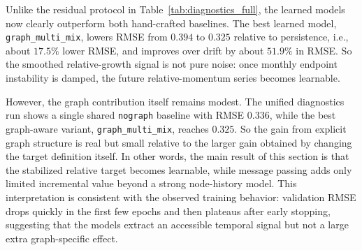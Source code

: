 \documentclass[pdflatex,sn-basic]{sn-jnl}
\begin{document}
\begin{table}[htbp]
\centering
\caption{Evaluation on the full heatmap under \texttt{TARGET\_MODE=smooth\_relative\_level}. The predicted signal is the future value of the trailing-12 / lag-12 relative-growth series. Results come from the unified diagnostics run on all 532 active keywords, with \texttt{TEMP\_WINDOW=12} and \texttt{FORECAST=24}.}
\label{tab:smooth_relative_comparison}
\end{table}

Unlike the residual protocol in Table~\ref{tab:diagnostics_full}, the learned models now clearly outperform both hand-crafted baselines. The best learned model, \texttt{graph\_multi\_mix}, lowers RMSE from \(0.394\) to \(0.325\) relative to persistence, i.e., about \(17.5\%\) lower RMSE, and improves over drift by about \(51.9\%\) in RMSE. So the smoothed relative-growth signal is not pure noise: once monthly endpoint instability is damped, the future relative-momentum series becomes learnable.

However, the graph contribution itself remains modest. The unified diagnostics run shows a single shared \texttt{nograph} baseline with RMSE \(0.336\), while the best graph-aware variant, \texttt{graph\_multi\_mix}, reaches \(0.325\). So the gain from explicit graph structure is real but small relative to the larger gain obtained by changing the target definition itself. In other words, the main result of this section is that the stabilized relative target becomes learnable, while message passing adds only limited incremental value beyond a strong node-history model. This interpretation is consistent with the observed training behavior: validation RMSE drops quickly in the first few epochs and then plateaus after early stopping, suggesting that the models extract an accessible temporal signal but not a large extra graph-specific effect.
\end{document}
